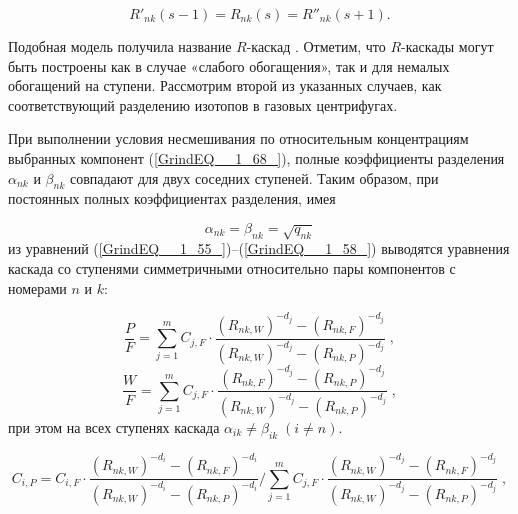 \begin{equation} \label{GrindEQ__1_68_} 
  R'_{nk} (s-1)=R_{nk} (s)=R''_{nk} (s+1).                                                 
\end{equation} 

Подобная модель получила название $R$-каскад \cite{sulaberidzeTeoriyaKaskadovDlya2011}. Отметим, что $R$-каскады могут быть построены как в случае «слабого обогащения», так и для немалых обогащений на ступени. Рассмотрим второй из указанных случаев, как соответствующий разделению изотопов в газовых центрифугах.

При выполнении условия несмешивания по относительным концентрациям выбранных компонент (\ref{GrindEQ__1_68_}), полные коэффициенты разделения $\alpha _{nk}$ и $\beta _{nk}$ совпадают для двух соседних ступеней. Таким образом, при постоянных полных коэффициентах разделения, имея

\begin{equation} \label{GrindEQ__1_69_} 
  \alpha _{nk} =\beta _{nk} =\sqrt{q_{nk} }  
\end{equation} 
из уравнений (\ref{GrindEQ__1_55_})--(\ref{GrindEQ__1_58_}) выводятся уравнения каскада со ступенями симметричными относительно пары компонентов с номерами $n$ и $k$:
  
\begin{equation} \label{GrindEQ__1_70_} 
  \frac{P}{F} =\sum _{j=1}^{m}C_{j,F} \cdot \frac{(R_{nk,W} )^{-d_{j} } -(R_{nk,F} )^{-d_{j} } }{(R_{nk,W} )^{-d_{j} } -(R_{nk,P} )^{-d_{j} } }  \; ,                                            
\end{equation} 
\begin{equation} \label{GrindEQ__1_71_} 
  \frac{W}{F} =\sum _{j=1}^{m}C_{j,F} \cdot \frac{(R_{nk,F} )^{-d_{j} } -(R_{nk,P} )^{-d_{j} } }{(R_{nk,W} )^{-d_{j} } -(R_{nk,P} )^{-d_{j} } }  \; ,                                        
\end{equation} 
при этом на всех ступенях каскада $\alpha _{ik} \ne \beta _{ik} \; (i\ne n)$.

\begin{equation} \label{GrindEQ__1_72_} 
  C_{i,P}=C_{i,F} \cdot \frac{\left(R_{n k,W}\right)^{-d_{i}}-\left(R_{n k,F}\right)^{-d_{i}}}{\left(R_{n k,W}\right)^{-d_{i}}-\left(R_{n k,P}\right)^{-d_{i}}} / \sum_{j=1}^{m} C_{j,F} \cdot \frac{\left(R_{n k,W}\right)^{-d_{j}}-\left(R_{n k,F}\right)^{-d_{j}}}{\left(R_{n k,W}\right)^{-d_{j}}-\left(R_{n k,P}\right)^{-d_{j}}}\; ,
\end{equation} 

